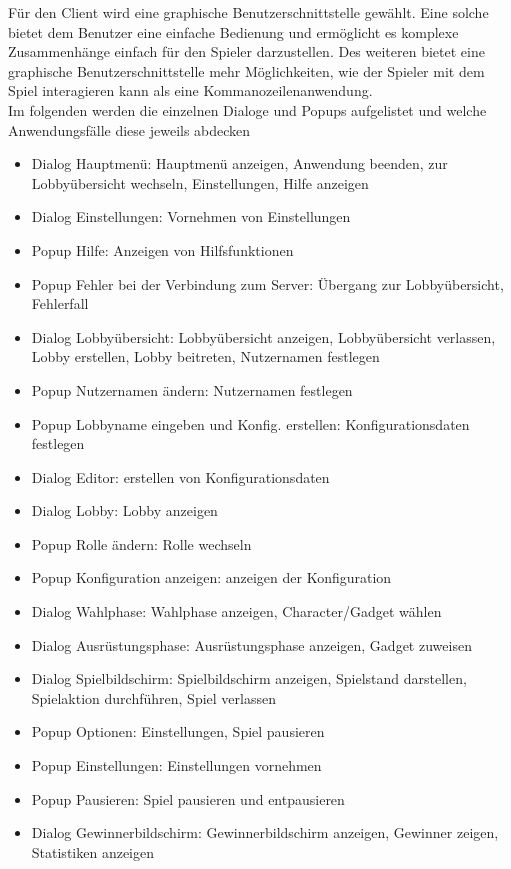 Für den Client wird eine graphische Benutzerschnittstelle gewählt.
Eine solche bietet dem Benutzer eine einfache Bedienung und ermöglicht es komplexe Zusammenhänge einfach für den Spieler darzustellen.
Des weiteren bietet eine graphische Benutzerschnittstelle mehr Möglichkeiten, wie der Spieler mit dem Spiel interagieren kann als eine Kommanozeilenanwendung.\\

Im folgenden werden die einzelnen Dialoge und Popups aufgelistet und welche Anwendungsfälle diese jeweils abdecken

\begin{itemize}
	\item Dialog Hauptmenü: Hauptmenü anzeigen, Anwendung beenden, zur Lobbyübersicht wechseln, Einstellungen, Hilfe anzeigen
	\item Dialog Einstellungen: Vornehmen von Einstellungen
	\item Popup Hilfe: Anzeigen von Hilfsfunktionen
	\item Popup Fehler bei der Verbindung zum Server: Übergang zur Lobbyübersicht, Fehlerfall
	\item Dialog Lobbyübersicht: Lobbyübersicht anzeigen, Lobbyübersicht verlassen, Lobby erstellen, Lobby beitreten, Nutzernamen festlegen
	\item Popup Nutzernamen ändern: Nutzernamen festlegen
	\item Popup Lobbyname eingeben und Konfig. erstellen: Konfigurationsdaten festlegen
	\item Dialog Editor: erstellen von Konfigurationsdaten
	\item Dialog Lobby: Lobby anzeigen
	\item Popup Rolle ändern: Rolle wechseln
	\item Popup Konfiguration anzeigen: anzeigen der Konfiguration
	\item Dialog Wahlphase: Wahlphase anzeigen, Character/Gadget wählen
	\item Dialog Ausrüstungsphase: Ausrüstungsphase anzeigen, Gadget zuweisen
	\item Dialog Spielbildschirm: Spielbildschirm anzeigen, Spielstand darstellen, Spielaktion durchführen, Spiel verlassen
	\item Popup Optionen: Einstellungen, Spiel pausieren
	\item Popup Einstellungen: Einstellungen vornehmen
	\item Popup Pausieren: Spiel pausieren und entpausieren
	\item Dialog Gewinnerbildschirm: Gewinnerbildschirm anzeigen, Gewinner zeigen, Statistiken anzeigen
\end{itemize}

